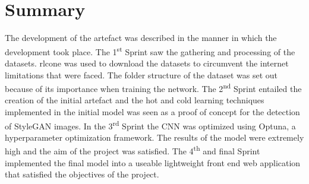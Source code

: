 \section{Summary}

The development of the artefact was described in the manner in which the development took place. The 1\textsuperscript{st} Sprint saw the gathering and processing of the datasets. rlcone was used to download the datasets to circumvent the internet limitations that were faced. The folder structure of the dataset was set out because of its importance when training the network. The 2\textsuperscript{nd} Sprint entailed the creation of the initial artefact and the hot and cold learning techniques implemented in the initial model was seen as a proof of concept for the detection of StyleGAN images. In the 3\textsuperscript{rd} Sprint the CNN was optimized using Optuna, a hyperparameter optimization framework. The results of the model were extremely high and the aim of the project was satisfied. The 4\textsuperscript{th} and final Sprint implemented the final model into a useable lightweight front end web application that satisfied the objectives of the project.
